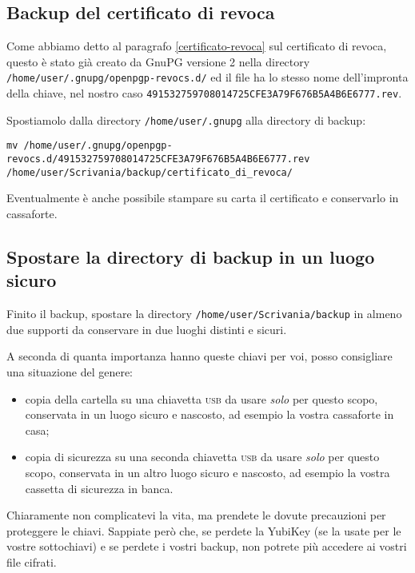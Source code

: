 \subsection{Backup del certificato di revoca} \label{backup-certificato-revoca}

Come abbiamo detto al paragrafo \vref{certificato-revoca} sul certificato di
revoca, questo è stato già creato da GnuPG versione 2 nella directory
\texttt{/home/user/.gnupg/openpgp-revocs.d/} ed il file ha lo stesso nome
dell'impronta della chiave, nel nostro caso
\texttt{491532759708014725CFE3A79F676B5A4B6E6777.rev}.

Spostiamolo dalla directory \texttt{/home/user/.gnupg} alla directory di backup:

\begin{lstlisting}
mv /home/user/.gnupg/openpgp-revocs.d/491532759708014725CFE3A79F676B5A4B6E6777.rev /home/user/Scrivania/backup/certificato_di_revoca/
\end{lstlisting}

Eventualmente è anche possibile stampare su carta il certificato e conservarlo
in cassaforte.

\subsection{Spostare la directory di backup in un luogo sicuro}

Finito il backup, spostare la directory \texttt{/home/user/Scrivania/backup} in
almeno due supporti da conservare in due luoghi distinti e sicuri.

A seconda di quanta importanza hanno queste chiavi per voi, posso consigliare
una situazione del genere:

\begin{itemize}
 \item copia della cartella su una chiavetta \textsc{usb} da usare \emph{solo}
 per questo scopo, conservata in un luogo sicuro e nascosto, ad esempio la
 vostra cassaforte in casa;
 \item copia di sicurezza su una seconda chiavetta \textsc{usb} da usare
 \emph{solo} per questo scopo, conservata in un altro luogo sicuro e nascosto,
 ad esempio la vostra cassetta di sicurezza in banca.
\end{itemize}

Chiaramente non complicatevi la vita, ma prendete le dovute precauzioni per
proteggere le chiavi. Sappiate però che, se perdete la YubiKey (se la usate per
le vostre sottochiavi) e se perdete i vostri backup, non potrete più accedere ai
vostri file cifrati.
